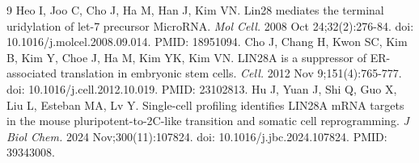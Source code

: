 \documentclass[11pt, a4paper]{article}
\begin{document}
\begin{thebibliography}{9}
 Heo I, Joo C, Cho J, Ha M, Han J, Kim VN. Lin28 mediates the terminal uridylation of let-7 precursor MicroRNA. \textit{Mol Cell.} 2008 Oct 24;32(2):276-84. doi: 10.1016/j.molcel.2008.09.014. PMID: 18951094.
 Cho J, Chang H, Kwon SC, Kim B, Kim Y, Choe J, Ha M, Kim YK, Kim VN. LIN28A is a suppressor of ER-associated translation in embryonic stem cells. \textit{Cell.} 2012 Nov 9;151(4):765-777. doi: 10.1016/j.cell.2012.10.019. PMID: 23102813.
 Hu J, Yuan J, Shi Q, Guo X, Liu L, Esteban MA, Lv Y. Single-cell profiling identifies LIN28A mRNA targets in the mouse pluripotent-to-2C-like transition and somatic cell reprogramming. \textit{J Biol Chem.} 2024 Nov;300(11):107824. doi: 10.1016/j.jbc.2024.107824. PMID: 39343008.
\end{thebibliography}
\end{document}
